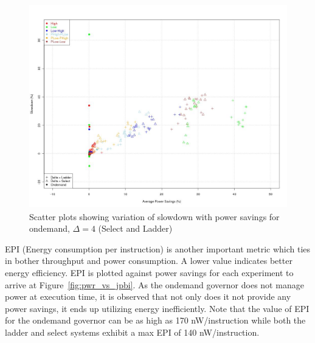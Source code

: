 \begin{figure}[h!]
  \begin{center}
    \includegraphics[height=3.5in]{figures/pwr_vs_slowdown_delta_4.jpg}%
    \caption{Scatter plots showing variation of slowdown with power savings for ondemand, $\Delta=4$ (Select and Ladder)}
    \label{fig:pwr_vs_slowdown}
  \end{center}
\end{figure}

EPI (Energy consumption per instruction) is another important metric which ties in bother throughput and power
consumption. A lower value indicates better energy efficiency. EPI is plotted 
against power savings for each experiment to arrive at Figure~\ref{fig:pwr_vs_jpbi}. As the ondemand governor
does not manage power at execution time, it is observed that not only does it not provide any power savings, 
it ends up utilizing energy inefficiently. Note that the value of EPI for the ondemand governor can be as high
as 170 nW/instruction while both the ladder and select systems exhibit a max EPI of 140 nW/instruction.

